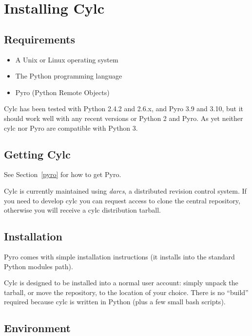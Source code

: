 \documentclass[11pt,a4paper]{article}
\begin{document}
\pagebreak
\section{Installing Cylc} 
\label{InstallingCylc}

\subsection{Requirements} 
\label{Requirements}

\begin{itemize}
    \item A Unix or Linux operating system
    \item The Python programming language
    \item Pyro (Python Remote Objects)
\end{itemize}

Cylc has been tested with Python 2.4.2 and 2.6.x, and Pyro 3.9 and 3.10,
but it should work well with any recent versions or Python 2 and Pyro.
As yet neither cylc nor Pyro are compatible with Python 3. 

\subsection{Getting Cylc} 
\label{GettingCylc}

See Section~\ref{pyro} for how to get Pyro.

Cylc is currently maintained using {\em darcs}, a distributed revision
control system. If you need to develop cylc you can request access to
clone the central repository, otherwise you will receive a cylc
distribution tarball. 

\subsection{Installation} 
\label{Installation}

Pyro comes with simple installation instructions (it installs into the
standard Python modules path). 

Cylc is designed to be installed into a normal user account: simply
unpack the tarball, or move the repository, to the location of your
choice. There is no ``build'' required because cylc is written in Python
(plus a few small bash scripts).

\subsection{Environment} 
\label{Environment}
\end{document}

